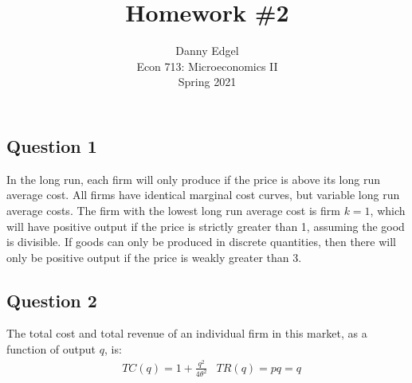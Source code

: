 \documentclass{article}
\begin{document}
\title{	Homework \#2 }
\author{ 	Danny Edgel 					\\ 
			Econ 713: Microeconomics II		\\
			Spring 2021						\\
		}
\maketitle\thispagestyle{empty}



\subsection*{Question 1}

In the long run, each firm will only produce if the price is above its long run average cost. All firms have identical marginal cost curves, but variable long run average costs. The firm with the lowest long run average cost is firm ${k=1}$, which will have positive output if the price is strictly greater than 1, assuming the good is divisible. If goods can only be produced in discrete quantities, then there will only be positive output if the price is weakly greater than 3.


\subsection*{Question 2}

The total cost and total revenue of an individual firm in this market, as a function of output $q$, is:
\begin{align*}
	&TC(q) = 1 + \frac{q^2}{4\theta^2} 		&TR(q) = pq = q
\end{align*}
\end{document}
